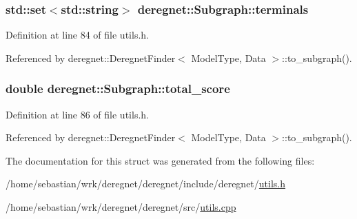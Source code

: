 \subsubsection[{\texorpdfstring{terminals}{terminals}}]{\setlength{\rightskip}{0pt plus 5cm}std\+::set$<$std\+::string$>$ deregnet\+::\+Subgraph\+::terminals}\hypertarget{structderegnet_1_1Subgraph_a030ed025dd1e2e38c48147283a93bd61}{}\label{structderegnet_1_1Subgraph_a030ed025dd1e2e38c48147283a93bd61}


Definition at line 84 of file utils.\+h.



Referenced by deregnet\+::\+Deregnet\+Finder$<$ Model\+Type, Data $>$\+::to\+\_\+subgraph().

\subsubsection[{\texorpdfstring{total\+\_\+score}{total_score}}]{\setlength{\rightskip}{0pt plus 5cm}double deregnet\+::\+Subgraph\+::total\+\_\+score}\hypertarget{structderegnet_1_1Subgraph_a3fdd10c0e803822ae09a71e5b549e471}{}\label{structderegnet_1_1Subgraph_a3fdd10c0e803822ae09a71e5b549e471}


Definition at line 86 of file utils.\+h.



Referenced by deregnet\+::\+Deregnet\+Finder$<$ Model\+Type, Data $>$\+::to\+\_\+subgraph().



The documentation for this struct was generated from the following files\+:\begin{DoxyCompactItemize}
\item 
/home/sebastian/wrk/deregnet/deregnet/include/deregnet/\hyperlink{utils_8h}{utils.\+h}\item 
/home/sebastian/wrk/deregnet/deregnet/src/\hyperlink{utils_8cpp}{utils.\+cpp}\end{DoxyCompactItemize}

